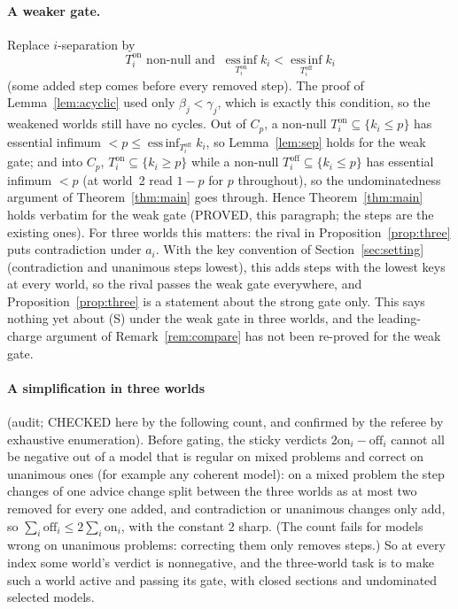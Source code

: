 \documentclass[11pt]{article}
\theoremstyle{definition}\newtheorem{definition}[theorem]{Definition}
\theoremstyle{remark}\newtheorem{remark}[theorem]{Remark}
\newcommand{\on}{\mathrm{on}}
\newcommand{\off}{\mathrm{off}}
\newcommand{\essinf}{\operatorname*{ess\,inf}}
\begin{document}
\paragraph{A weaker gate.} Replace $i$-separation by
\[
 T^\on_i\text{ non-null and }\
 \essinf_{T^\on_i}k_i<\essinf_{T^\off_i}k_i
\]
(some added step comes before every removed step). The proof of
Lemma~\ref{lem:acyclic} used only $\beta_j<\gamma_j$, which is exactly this
condition, so the weakened worlds still have no cycles. Out of $C_p$, a non-null
$T^\on_i\subseteq\{k_i\le p\}$ has essential infimum $<p\le
\essinf_{T^\off_i}k_i$, so Lemma~\ref{lem:sep} holds for the weak gate; and
into $C_p$, $T^\on_i\subseteq\{k_i\ge p\}$ while a non-null
$T^\off_i\subseteq\{k_i\le p\}$ has essential infimum $<p$ (at world~2 read
$1-p$ for $p$ throughout), so the
undominatedness argument of Theorem~\ref{thm:main} goes through. Hence
Theorem~\ref{thm:main} holds verbatim for the weak gate (PROVED, this
paragraph; the steps are the existing ones). For three worlds this matters:
the rival in Proposition~\ref{prop:three} puts contradiction under $a_i$.
With the key convention of Section~\ref{sec:setting} (contradiction and
unanimous steps lowest), this adds steps with the lowest keys at every world,
so the rival passes the weak gate everywhere, and Proposition~\ref{prop:three}
is a statement about the strong gate only. This says nothing yet about (S)
under the weak gate in three worlds, and the leading-charge argument of
Remark~\ref{rem:compare} has not been re-proved for the weak gate.

\paragraph{A simplification in three worlds} (audit; CHECKED here by the
following count, and confirmed by the referee by exhaustive enumeration).
Before gating, the sticky verdicts $2\on_i-\off_i$ cannot all be negative out
of a model that is regular on mixed problems and correct on unanimous ones (for
example any coherent model): on a mixed problem the step changes of one advice
change split between the three worlds as at most two removed for every one
added, and contradiction or unanimous changes only add, so
$\sum_i\off_i\le2\sum_i\on_i$, with the constant $2$ sharp. (The count fails
for models wrong on unanimous problems: correcting them only removes steps.) So
at every index some world's verdict is nonnegative, and the three-world task is
to make such a world active and passing its gate, with closed sections and
undominated selected models.
\end{document}
